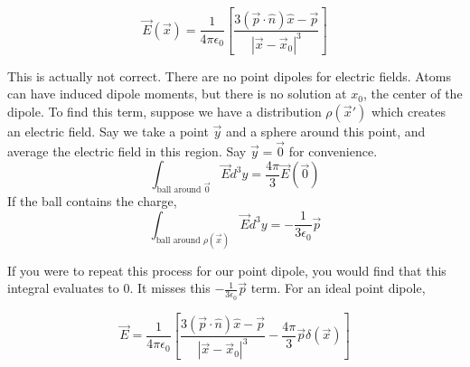 \documentclass[a4paper,twoside,master.tex]{subfiles}
\begin{document}
\begin{equation}
    \vec{E}(\vec{x}) = \frac{1}{4\pi\epsilon_0}\left[ \frac{3(\vec{p}\cdot \hat{n})\hat{x} - \vec{p}}{|\vec{x}-\vec{x}_0|^3} \right]
\end{equation}

This is actually not correct. There are no point dipoles for electric fields. Atoms can have induced dipole moments, but there is no solution at $x_0$, the center of the dipole. To find this term, suppose we have a distribution $\rho(\vec{x}')$ which creates an electric field. Say we take a point $\vec{y}$ and a sphere around this point, and average the electric field in this region. Say $\vec{y}=\vec{0}$ for convenience.
\begin{equation}
    \int_{\text{ball around } \vec{0}} \vec{E} d^3y = \frac{4\pi}{3} \vec{E}(\vec{0})
\end{equation}
If the ball contains the charge,
\begin{equation}
    \int_{\text{ball around } \rho(\vec{x})} \vec{E}d^3y = -\frac{1}{3\epsilon_0}\vec{p}
\end{equation}

If you were to repeat this process for our point dipole, you would find that this integral evaluates to $0$. It misses this $- \frac{1}{3\epsilon_0}\vec{p}$ term. For an ideal point dipole,

\begin{equation}
    \vec{E} = \frac{1}{4\pi\epsilon_0}\left[ \frac{3(\vec{p}\cdot \hat{n})\hat{x} - \vec{p}}{|\vec{x}-\vec{x}_0|^3}-\frac{4\pi}{3}\vec{p}\delta(\vec{x}) \right]
\end{equation}
\end{document}
